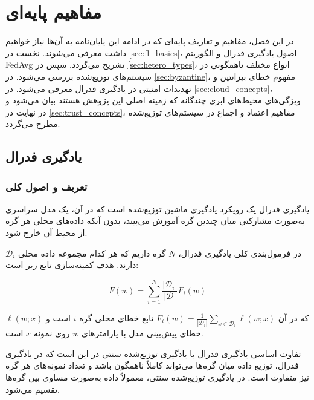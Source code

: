 \chapter{مفاهیم پایه‌ای}
\label{chap:concepts}

در این فصل، مفاهیم و تعاریف پایه‌ای که در ادامه این پایان‌نامه به آن‌ها نیاز خواهیم داشت معرفی می‌شوند. نخست در \autoref{sec:fl_basics}، اصول یادگیری فدرال و الگوریتم \gls{FedAvg} تشریح می‌گردد. سپس در \autoref{sec:hetero_types}، انواع مختلف ناهمگونی در سیستم‌های توزیع‌شده بررسی می‌شود. در \autoref{sec:byzantine}، مفهوم خطای بیزانتین و تهدیدات امنیتی در یادگیری فدرال معرفی می‌شود. در \autoref{sec:cloud_concepts}، ویژگی‌های محیط‌های ابری چندگانه که زمینه اصلی این پژوهش هستند بیان می‌شود و در نهایت در \autoref{sec:trust_concepts}، مفاهیم اعتماد و اجماع در سیستم‌های توزیع‌شده مطرح می‌گردد.

\section{یادگیری فدرال}
\label{sec:fl_basics}

\subsection{تعریف و اصول کلی}

\begin{ntdefinition}
یادگیری فدرال یک رویکرد یادگیری ماشین توزیع‌شده است که در آن، یک مدل سراسری به‌صورت مشارکتی میان چندین گره آموزش می‌بیند، بدون آنکه داده‌های محلی هر گره از محیط آن خارج شود.
\end{ntdefinition}

در فرمول‌بندی کلی یادگیری فدرال، $N$ گره داریم که هر کدام مجموعه داده محلی $\mathcal{D}_i$ دارند. هدف کمینه‌سازی تابع زیر است:

\begin{equation}
    F(w) = \sum_{i=1}^{N} \frac{|\mathcal{D}_i|}{|\mathcal{D}|} F_i(w)
    \label{eq:fed_objective}
\end{equation}

که در آن $F_i(w) = \frac{1}{|\mathcal{D}_i|}\sum_{x \in \mathcal{D}_i} \ell(w; x)$ تابع خطای محلی گره $i$ است و $\ell(w; x)$ خطای پیش‌بینی مدل با پارامترهای $w$ روی نمونه $x$ است.

\begin{note}
    تفاوت اساسی یادگیری فدرال با یادگیری توزیع‌شده سنتی در این است که در یادگیری فدرال، توزیع داده میان گره‌ها می‌تواند کاملاً ناهمگون باشد و تعداد نمونه‌های هر گره نیز متفاوت است. در یادگیری توزیع‌شده سنتی، معمولاً داده به‌صورت مساوی بین گره‌ها تقسیم می‌شود.
\end{note}

